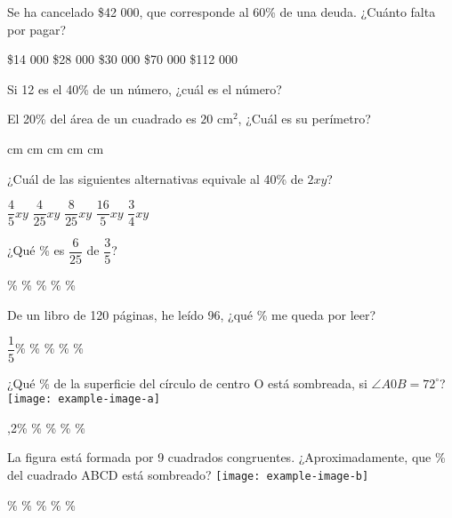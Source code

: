 \documentclass[pagina vacia]{srs}
\begin{document}
\begin{preguntas}[after-item-skip=2cm]
\pregunta Se ha cancelado \$42 000, que corresponde al 60\% de una deuda. ¿Cuánto falta por pagar?
\begin{vertical}
\alternativa \$14 000
\alternativa \$28 000
\alternativa \$30 000
\alternativa \$70 000
\alternativa \$112 000
\end{vertical}

\pregunta Si 12 es el 40\% de un número, ¿cuál es el número?
\begin{vertical}
\end{vertical}

\pregunta El 20\% del área de un cuadrado es \(20 \text{ cm}^2\), ¿Cuál es su perímetro?
\begin{vertical}
 cm
 cm
 cm
 cm
 cm
\end{vertical}

\pregunta ¿Cuál de las siguientes alternativas equivale al 40\% de \(2xy\)?
\begin{vertical}
\alternativa \(\dfrac{4}{5}xy\)
\alternativa \(\dfrac{4}{25}xy\)
\alternativa \(\dfrac{8}{25}xy\)
\alternativa \(\dfrac{16}{5}xy\)
\alternativa \(\dfrac{3}{4}xy\)
\end{vertical}

\pregunta ¿Qué \% es \(\dfrac{6}{25}\) de \(\dfrac{3}{5}\)?
\begin{vertical}
\%
\%
\%
\%
\%
\end{vertical}

\pregunta De un libro de 120 páginas, he leído 96, ¿qué \% me queda por leer?
\begin{vertical}
\alternativa \(\dfrac{1}{5}\)\%
\%
\%
\%
\%
\end{vertical}

\pregunta ¿Qué \% de la superficie del círculo de centro O está sombreada, si \(\angle A0B = 72^\circ\)?
\texttt{[image: example-image-a]}
\begin{vertical}
,2\%
\%
\%
\%
\%
\end{vertical}

\pregunta La figura está formada por 9 cuadrados congruentes. ¿Aproximadamente, que \% del cuadrado ABCD está sombreado?
\texttt{[image: example-image-b]}
\begin{vertical}
\%
\%
\%
\%
\%
\end{vertical}


\end{preguntas}
\end{document}
